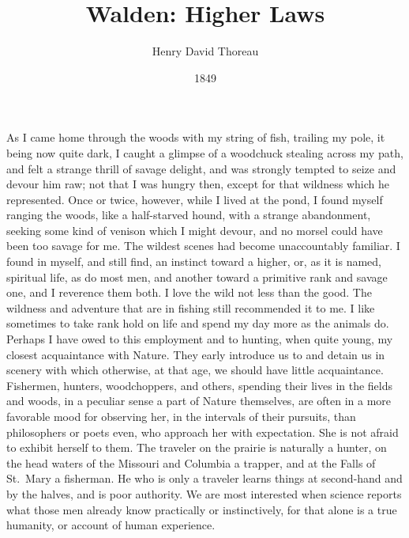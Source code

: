 \documentclass[letterpaper,12pt]{article}
\title{\vspace{-2em}Walden: Higher Laws}
\author{Henry David Thoreau}
\date{1849}
\begin{document}
\maketitle

\paragraph{} As I came home through the woods with my string of fish, trailing
my pole, it being now quite dark, I caught a glimpse of a woodchuck stealing
across my path, and felt a strange thrill of savage delight, and was strongly
tempted to seize and devour him raw; not that I was hungry then, except for that
wildness which he represented. Once or twice, however, while I lived at the
pond, I found myself ranging the woods, like a half-starved hound, with a
strange abandonment, seeking some kind of venison which I might devour, and no
morsel could have been too savage for me. The wildest scenes had become
unaccountably familiar. I found in myself, and still find, an instinct toward a
higher, or, as it is named, spiritual life, as do most men, and another toward a
primitive rank and savage one, and I reverence them both. I love the wild not
less than the good. The wildness and adventure that are in fishing still
recommended it to me. I like sometimes to take rank hold on life and spend my
day more as the animals do.  Perhaps I have owed to this employment and to
hunting, when quite young, my closest acquaintance with Nature. They early
introduce us to and detain us in scenery with which otherwise, at that age, we
should have little acquaintance.  Fishermen, hunters, woodchoppers, and others,
spending their lives in the fields and woods, in a peculiar sense a part of
Nature themselves, are often in a more favorable mood for observing her, in the
intervals of their pursuits, than philosophers or poets even, who approach her
with expectation. She is not afraid to exhibit herself to them. The traveler on
the prairie is naturally a hunter, on the head waters of the Missouri and
Columbia a trapper, and at the Falls of St.\ Mary a fisherman. He who is only a
traveler learns things at second-hand and by the halves, and is poor authority.
We are most interested when science reports what those men already know
practically or instinctively, for that alone is a true humanity, or account of
human experience.
\end{document}
